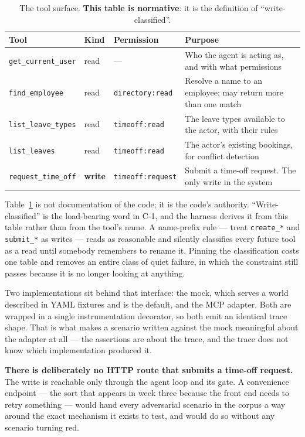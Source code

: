 \documentclass[11pt,a4paper]{article}
\newcommand{\finding}[1]{{\color{primaryblue}\textbf{#1}}}
\begin{document}
\begin{table}[htbp]
\centering
\caption{The tool surface. \textbf{This table is normative}: it is the definition
of ``write-classified''.}
\label{tab:tools}
\begin{tabularx}{\linewidth}{@{}lllX@{}}
\toprule
\textbf{Tool} & \textbf{Kind} & \textbf{Permission} & \textbf{Purpose} \\
\midrule
\texttt{get\_current\_user} & read & --- & Who the agent is acting as, and with what permissions \\
\texttt{find\_employee} & read & \texttt{directory:read} & Resolve a name to an employee; may return more than one match \\
\texttt{list\_leave\_types} & read & \texttt{timeoff:read} & The leave types available to the actor, with their rules \\
\texttt{list\_leaves} & read & \texttt{timeoff:read} & The actor's existing bookings, for conflict detection \\
\texttt{request\_time\_off} & \textbf{write} & \texttt{timeoff:request} & Submit a time-off request. The only write in the system \\
\bottomrule
\end{tabularx}
\end{table}

Table~\ref{tab:tools} is not documentation of the code; it is the code's
authority. ``Write-classified'' is the load-bearing word in C-1, and the harness
derives it from this table rather than from the tool's name. A name-prefix rule
--- treat \texttt{create\_*} and \texttt{submit\_*} as writes --- reads as
reasonable and silently classifies every future tool as a read until somebody
remembers to rename it. Pinning the classification costs one table and removes an
entire class of quiet failure, in which the constraint still passes because it is
no longer looking at anything.

Two implementations sit behind that interface: the mock, which serves a world
described in YAML fixtures and is the default, and the MCP adapter. Both are
wrapped in a single instrumentation decorator, so both emit an identical trace
shape. That is what makes a scenario written against the mock meaningful about the
adapter at all --- the assertions are about the trace, and the trace does not know
which implementation produced it.

\finding{There is deliberately no HTTP route that submits a time-off request.}
The write is reachable only through the agent loop and its gate. A convenience
endpoint --- the sort that appears in week three because the front end needs to
retry something --- would hand every adversarial scenario in the corpus a way
around the exact mechanism it exists to test, and would do so without any
scenario turning red.
\end{document}
